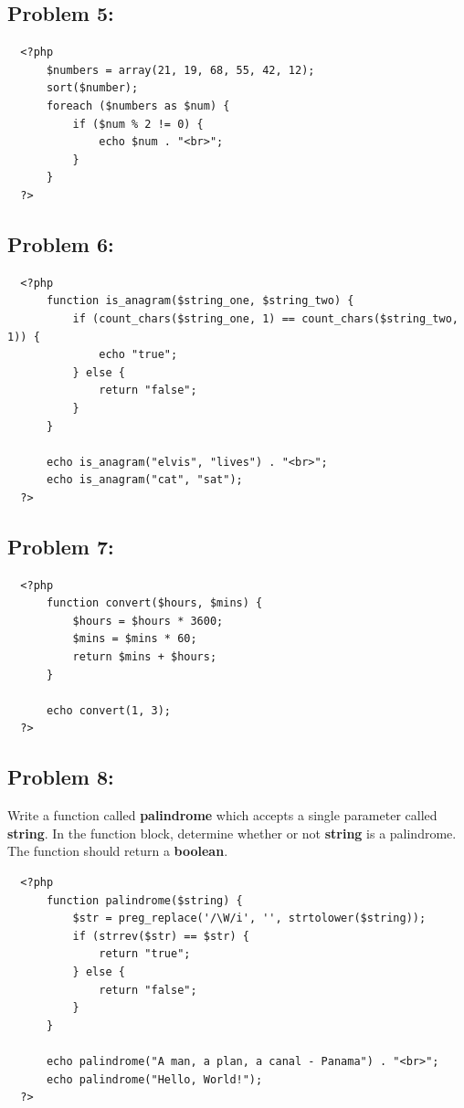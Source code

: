 \documentclass{article}
\begin{document}
\subsection*{Problem 5:}
\begin{verbatim}
  <?php  
      $numbers = array(21, 19, 68, 55, 42, 12);
      sort($number);
      foreach ($numbers as $num) {
          if ($num % 2 != 0) {
              echo $num . "<br>";
          }
      }
  ?>
\end{verbatim}

\subsection*{Problem 6:}
\begin{verbatim}
  <?php  
      function is_anagram($string_one, $string_two) {
          if (count_chars($string_one, 1) == count_chars($string_two, 1)) {
              echo "true";
          } else {
              return "false";
          }
      }

      echo is_anagram("elvis", "lives") . "<br>";
      echo is_anagram("cat", "sat");
  ?>
\end{verbatim}

\subsection*{Problem 7:}
\begin{verbatim}
  <?php  
      function convert($hours, $mins) {
          $hours = $hours * 3600;
          $mins = $mins * 60;
          return $mins + $hours;
      }

      echo convert(1, 3);
  ?>
\end{verbatim}

\subsection*{Problem 8:}
Write a function called \textbf{palindrome} which accepts a single parameter called \textbf{string}. In the function block, determine whether or not \textbf{string} is a palindrome. The function should return a \textbf{boolean}. 

\begin{verbatim}
  <?php  
      function palindrome($string) {
          $str = preg_replace('/\W/i', '', strtolower($string));
          if (strrev($str) == $str) { 
              return "true"; 
          } else {
              return "false";
          }
      }

      echo palindrome("A man, a plan, a canal - Panama") . "<br>";
      echo palindrome("Hello, World!");
  ?>
\end{verbatim}
\end{document}
